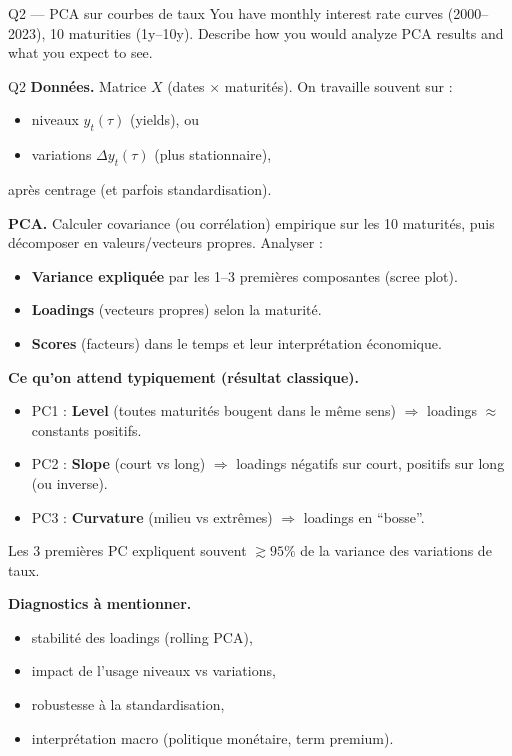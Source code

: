 \begin{questionbox}{Q2 --- PCA sur courbes de taux}
You have monthly interest rate curves (2000--2023), 10 maturities (1y--10y). Describe how you would analyze PCA results and what you expect to see.
\end{questionbox}

\begin{solutionbox}{Q2}
\textbf{Données.} Matrice $X$ (dates $\times$ maturités). On travaille souvent sur :
\begin{itemize}[leftmargin=*]
  \item niveaux $y_t(\tau)$ (yields), ou
  \item variations $\Delta y_t(\tau)$ (plus stationnaire),
\end{itemize}
après centrage (et parfois standardisation).

\medskip
\textbf{PCA.} Calculer covariance (ou corrélation) empirique sur les 10 maturités, puis décomposer en valeurs/vecteurs propres. Analyser :
\begin{itemize}[leftmargin=*]
  \item \textbf{Variance expliquée} par les 1--3 premières composantes (scree plot).
  \item \textbf{Loadings} (vecteurs propres) selon la maturité.
  \item \textbf{Scores} (facteurs) dans le temps et leur interprétation économique.
\end{itemize}

\medskip
\textbf{Ce qu'on attend typiquement (résultat classique).}
\begin{itemize}[leftmargin=*]
  \item PC1 : \textbf{Level} (toutes maturités bougent dans le même sens) $\Rightarrow$ loadings \(\approx\) constants positifs.
  \item PC2 : \textbf{Slope} (court vs long) $\Rightarrow$ loadings négatifs sur court, positifs sur long (ou inverse).
  \item PC3 : \textbf{Curvature} (milieu vs extrêmes) $\Rightarrow$ loadings en ``bosse''.
\end{itemize}
Les 3 premières PC expliquent souvent \(\gtrsim 95\%\) de la variance des variations de taux.

\medskip
\textbf{Diagnostics à mentionner.}
\begin{itemize}[leftmargin=*]
  \item stabilité des loadings (rolling PCA),
  \item impact de l'usage niveaux vs variations,
  \item robustesse à la standardisation,
  \item interprétation macro (politique monétaire, term premium).
\end{itemize}
\end{solutionbox}

